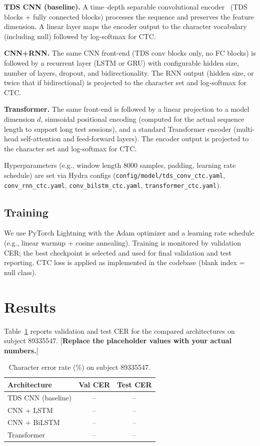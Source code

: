 \documentclass{article}
\begin{document}
\textbf{TDS CNN (baseline).} A time--depth separable convolutional encoder~\cite{emg2qwerty} (TDS blocks + fully connected blocks) processes the sequence and preserves the feature dimension. A linear layer maps the encoder output to the character vocabulary (including null) followed by log-softmax for CTC.

\textbf{CNN+RNN.} The same CNN front-end (TDS conv blocks only, no FC blocks) is followed by a recurrent layer (LSTM or GRU) with configurable hidden size, number of layers, dropout, and bidirectionality. The RNN output (hidden size, or twice that if bidirectional) is projected to the character set and log-softmax for CTC.

\textbf{Transformer.} The same front-end is followed by a linear projection to a model dimension $d$, sinusoidal positional encoding (computed for the actual sequence length to support long test sessions), and a standard Transformer encoder (multi-head self-attention and feed-forward layers). The encoder output is projected to the character set and log-softmax for CTC.

Hyperparameters (e.g., window length 8000 samples, padding, learning rate schedule) are set via Hydra configs (\texttt{config/model/tds\_conv\_ctc.yaml}, \texttt{conv\_rnn\_ctc.yaml}, \texttt{conv\_bilstm\_ctc.yaml}, \texttt{transformer\_ctc.yaml}).

\subsection{Training}
We use PyTorch Lightning with the Adam optimizer and a learning rate schedule (e.g., linear warmup + cosine annealing). Training is monitored by validation CER; the best checkpoint is selected and used for final validation and test reporting. CTC loss is applied as implemented in the codebase (blank index = null class).

\section{Results}
\label{sec:results}

Table~\ref{tab:cer} reports validation and test CER for the compared architectures on subject 89335547. [\textbf{Replace the placeholder values with your actual numbers.}]

\begin{table}[ht]
\centering
\caption{Character error rate (\%) on subject 89335547.}
\label{tab:cer}
\begin{tabular}{lcc}
\toprule
Architecture & Val CER & Test CER \\
\midrule
TDS CNN (baseline) & -- & -- \\
CNN + LSTM          & -- & -- \\
CNN + BiLSTM        & -- & -- \\
Transformer         & -- & -- \\
\bottomrule
\end{tabular}
\end{table}
\end{document}
